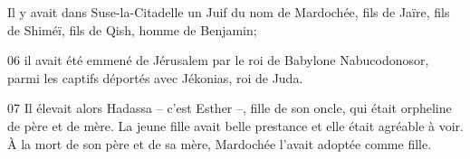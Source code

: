 Il y avait dans Suse-la-Citadelle un Juif du nom de Mardochée, fils de Jaïre, fils de Shiméï, fils de Qish, homme de Benjamin;

06 il avait été emmené de Jérusalem par le roi de Babylone Nabucodonosor, parmi les captifs déportés avec Jékonias, roi de Juda.

07 Il élevait alors Hadassa – c’est Esther –, fille de son oncle, qui était orpheline de père et de mère. La jeune fille avait belle prestance et elle était agréable à voir. À la mort de son père et de sa mère, Mardochée l’avait adoptée comme fille.
